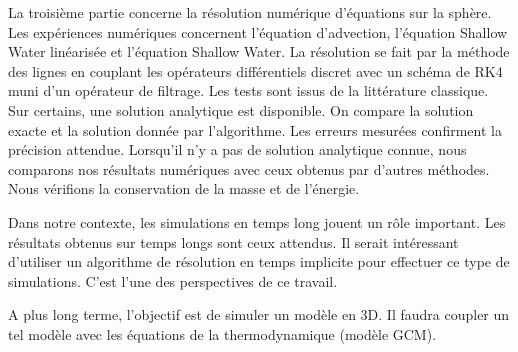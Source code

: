 \begin{FrenchAbstract}
La troisième partie concerne la résolution numérique d'équations sur la sphère. Les expériences numériques concernent l'équation d'advection, l'équation Shallow Water linéarisée et l'équation Shallow Water. La résolution se fait par la méthode des lignes en couplant les opérateurs différentiels discret avec un schéma de RK4 muni d'un opérateur de filtrage. Les tests sont issus de la littérature classique. Sur certains, une solution analytique est disponible. On compare la solution exacte et la solution donnée par l'algorithme. Les erreurs mesurées confirment la précision attendue. Lorsqu'il n'y a pas de solution analytique connue, nous comparons nos résultats numériques avec ceux obtenus par d’autres méthodes. Nous vérifions la conservation de la masse et de l'énergie. 

Dans notre contexte, les simulations en temps long jouent un rôle important. Les résultats obtenus sur temps longs sont ceux attendus. Il serait intéressant d'utiliser un algorithme de résolution en temps implicite pour effectuer ce type de simulations. C'est l'une des perspectives de ce travail.

A plus long terme, l'objectif est de simuler un modèle en 3D. Il faudra coupler un tel modèle avec les équations de la thermodynamique (modèle GCM).


  \end{FrenchAbstract}
  
  
  
  
  
  
  
